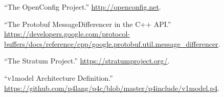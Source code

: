 \documentclass[11pt]{article}
\begin{document}
{{\begin{thebibliography}{40}
\mdbibitemlabel{{}[36]}\textquotedblleft{}The OpenConfig Project.\textquotedblright{} \href{http://openconfig.net}{{\ttfamily http://\hspace{0pt}openconfig.\hspace{0pt}net}}.\label{openconfig}%

\mdbibitemlabel{{}[37]}\textquotedblleft{}The Protobuf MessageDifferencer in the C++ API.\textquotedblright{} \href{https://developers.google.com/protocol-buffers/docs/reference/cpp/google.protobuf.util.message_differencer}{{\ttfamily https://\hspace{0pt}developers.\hspace{0pt}google.\hspace{0pt}com/\hspace{0pt}protocol-\hspace{0pt}buffers/\hspace{0pt}docs/\hspace{0pt}reference/\hspace{0pt}cpp/\hspace{0pt}google.\hspace{0pt}protobuf.\hspace{0pt}util.\hspace{0pt}message\_\hspace{0pt}differencer}}.\label{protomessagedifferencer}%

\mdbibitemlabel{{}[38]}\textquotedblleft{}The Stratum Project.\textquotedblright{} \href{https://stratumproject.org/}{{\ttfamily https://\hspace{0pt}stratumproject.\hspace{0pt}org/\hspace{0pt}}}.\label{stratum}%

\mdbibitemlabel{{}[39]}\textquotedblleft{}v1model Architecture Definition.\textquotedblright{} \href{https://github.com/p4lang/p4c/blob/master/p4include/v1model.p4}{{\ttfamily https://\hspace{0pt}github.\hspace{0pt}com/\hspace{0pt}p4lang/\hspace{0pt}p4c/\hspace{0pt}blob/\hspace{0pt}master/\hspace{0pt}p4include/\hspace{0pt}v1model.\hspace{0pt}p4}}.\label{v1model}%


\end{thebibliography}}}
\end{document}
